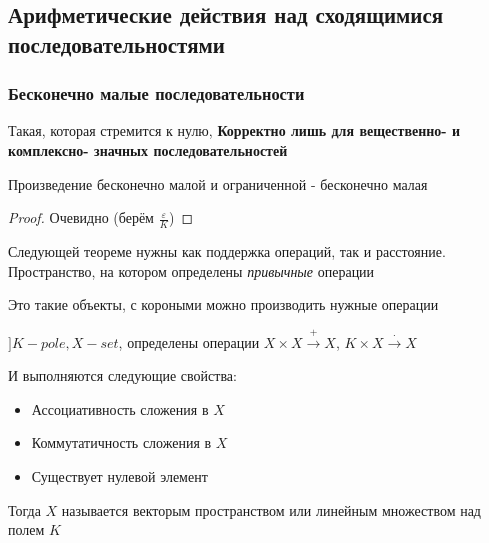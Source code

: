 \documentclass[12pt, a4paper]{article}
\begin{document}
  \subsection{Арифметические действия над сходящимися последовательностями}

  \subsubsection{Бесконечно малые последовательности}

  \begin{definition}
  Такая, которая стремится к нулю, \textbf{Корректно лишь для вещественно- и комплексно- значных последовательностей}
  \end{definition}

  \begin{lemma}
  Произведение бесконечно малой и ограниченной - бесконечно малая
  \end{lemma}
  \begin{proof}
  Очевидно (берём $\frac{\varepsilon}{K}$)
  \end{proof}


  \begin{note}
  Следующей теореме нужны как поддержка операций, так и расстояние.
  Пространство, на котором определены \textit{привычные} операции
  \end{note}

  \begin{definition}
  [Векторы]
  Это такие объекты, с короными можно производить нужные операции
  \end{definition}

  \begin{definition}
  $] K - pole, X - set$, определены операции 
  $X \times X \overset{+}{\longrightarrow} X$, $K \times X \overset{\cdot}{\longrightarrow} X$

  И выполняются следующие свойства:
  \begin{itemize}
    \item Ассоциативность сложения в $X$
    \item Коммутатичность сложения в $X$
    \item Существует нулевой элемент 
  \end{itemize}

  Тогда $X$ называется векторым пространством или линейным множеством над полем $K$
  \end{definition}
\end{document}
